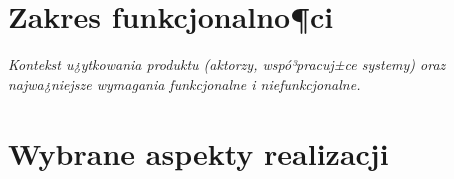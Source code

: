 \documentclass[polish,12pt]{aghthesis}
\begin{document}
\section{Zakres funkcjonalno¶ci}
\label{sec:zakres-funkcjonalnosci}

\emph{Kontekst u¿ytkowania produktu (aktorzy, wspó³pracuj±ce systemy)
  oraz najwa¿niejsze wymagania funkcjonalne i niefunkcjonalne.}

\section{Wybrane aspekty realizacji}
\label{sec:wybrane-aspekty-realizacji}
\end{document}
